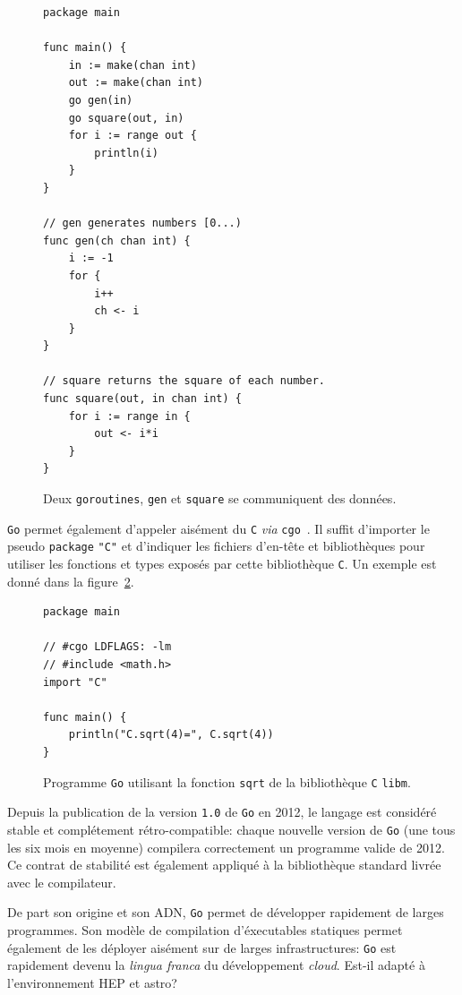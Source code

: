 \documentclass[a4paper,french]{article}
\begin{document}
\begin{figure}[h]
\begin{verbatim}
package main

func main() {
	in := make(chan int)
	out := make(chan int)
	go gen(in)
	go square(out, in)
	for i := range out {
		println(i)
	}
}

// gen generates numbers [0...)
func gen(ch chan int) {
	i := -1
	for {
		i++
		ch <- i
	}
}

// square returns the square of each number.
func square(out, in chan int) {
	for i := range in {
		out <- i*i
	}
}
\end{verbatim}
	\caption{\label{fig-goroutine}Deux \texttt{goroutines}, \texttt{gen} et
	\texttt{square} se communiquent des donn\'ees.}
\end{figure}

\texttt{Go} permet \'egalement d'appeler ais\'ement du \texttt{C} \emph{via}
\texttt{cgo}~\cite{ref-cgo}.
Il suffit d'importer le pseudo \texttt{package} \texttt{"C"} et d'indiquer les
fichiers d'en-t\^ete et biblioth\`eques pour utiliser les fonctions et types
expos\'es par cette biblioth\`eque \texttt{C}.
Un exemple est donn\'e dans la figure~\ref{fig-cgo}.

\begin{figure}[h]
\begin{verbatim}
package main

// #cgo LDFLAGS: -lm
// #include <math.h>
import "C"

func main() {
	println("C.sqrt(4)=", C.sqrt(4))
}
\end{verbatim}
	\caption{\label{fig-cgo}Programme \texttt{Go} utilisant la fonction
	\texttt{sqrt} de la biblioth\`eque \texttt{C} \texttt{libm}.}
\end{figure}

Depuis la publication de la version \texttt{1.0} de \texttt{Go} en 2012, le
langage est consid\'er\'e stable et compl\'etement r\'etro-compatible: chaque
nouvelle version de \texttt{Go} (une tous les six mois en moyenne) compilera
correctement un programme valide de 2012.
Ce contrat de stabilit\'e est \'egalement appliqu\'e \`a la biblioth\`eque
standard livr\'ee avec le compilateur.

De part son origine et son ADN, \texttt{Go} permet de d\'evelopper rapidement de
larges programmes.
Son mod\`ele de compilation d'\'executables statiques permet \'egalement de les
d\'eployer ais\'ement sur de larges infrastructures: \texttt{Go} est rapidement
devenu la \emph{lingua franca} du d\'eveloppement \emph{cloud}.
Est-il adapt\'e \`a l'environnement HEP et astro?
\end{document}
